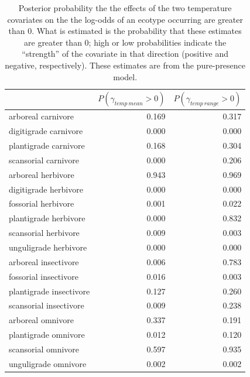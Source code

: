 \documentclass[12pt,letterpaper]{article}
\begin{document}
\begin{table}[ht]
  \centering
  \caption[Posterior probablity of effects of temperature on occurrence]{Posterior probability the the effects of the two temperature covariates on the the log-odds of an ecotype occurring are greater than 0. What is estimated is the probability that these estimates are greater than 0; high or low probabilities indicate the ``strength'' of the covariate in that direction (positive and negative, respectively). These estimates are from the pure-presence model.}
  \label{tab:occur_temp}
  \begin{tabular}{ l r r }
    \hline
    & \(P(\gamma_{temp\ mean} > 0)\) & \(P(\gamma_{temp\ range} > 0)\) \\ 
    \hline
    arboreal carnivore & 0.169 & 0.317 \\ 
    digitigrade carnivore & 0.000 & 0.000 \\ 
    plantigrade carnivore & 0.168 & 0.304 \\ 
    scansorial carnivore & 0.000 & 0.206 \\ 
    arboreal herbivore & 0.943 & 0.969 \\ 
    digitigrade herbivore & 0.000 & 0.000 \\ 
    fossorial herbivore & 0.001 & 0.022 \\ 
    plantigrade herbivore & 0.000 & 0.832 \\ 
    scansorial herbivore & 0.009 & 0.003 \\ 
    unguligrade herbivore & 0.000 & 0.000 \\ 
    arboreal insectivore & 0.006 & 0.783 \\ 
    fossorial insectivore & 0.016 & 0.003 \\ 
    plantigrade insectivore & 0.127 & 0.260 \\ 
    scansorial insectivore & 0.009 & 0.238 \\ 
    arboreal omnivore & 0.337 & 0.191 \\ 
    plantigrade omnivore & 0.012 & 0.120 \\ 
    scansorial omnivore & 0.597 & 0.935 \\ 
    unguligrade omnivore & 0.002 & 0.002 \\ 
    \hline
  \end{tabular}
\end{table}
\end{document}
